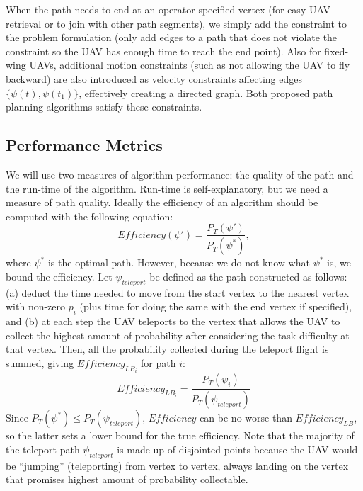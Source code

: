 When the path needs to end at an operator-specified vertex (for easy UAV retrieval or to join with other path segments), we simply add the constraint to the problem formulation (only add edges to a path that does not violate the constraint so the UAV has enough time to reach the end point). Also for fixed-wing UAVs, additional motion constraints (such as not allowing the UAV to fly backward) are also introduced as velocity constraints affecting edges $\{\psi(t), \psi(t_1)\}$, effectively creating a directed graph. Both proposed path planning algorithms satisfy these constraints.

\subsection{Performance Metrics}

We will use two measures of algorithm performance: the quality of the path and the run-time of the algorithm. Run-time is self-explanatory, but we need a measure of path quality. Ideally the efficiency of an algorithm should be computed with the following equation:
\begin{equation}
\mathit{Efficiency}(\psi') = \frac{P_T(\psi')}{P_T(\psi^*)},
\label{Efficiency}
\end{equation}
where $\psi^*$ is the optimal path. However, because we do not know what $\psi^*$ is, we bound the efficiency. Let $\psi_{teleport}$ be defined as the path constructed as follows: (a) deduct the time needed to move from the start vertex to the nearest vertex with non-zero $p_i$ (plus time for doing the same with the end vertex if specified), and (b) at each step the UAV teleports to the vertex that allows the UAV to collect the highest amount of probability after considering the task difficulty at that vertex. Then, all the probability collected during the teleport flight is summed, giving $\mathit{Efficiency_{LB_i}}$ for path $i$:
\begin{equation}
\mathit{Efficiency_{LB_i}} = \frac{P_T(\psi_i)}{P_T(\psi_{teleport})}
\label{EfficiencyLB}
\end{equation}
Since $P_T(\psi^*) \leq P_T(\psi_{teleport})$, $\mathit{Efficiency}$ can be no worse than $\mathit{Efficiency_{LB}}$, so the latter sets a lower bound for the true efficiency. Note that the majority of the teleport path $\psi_{teleport}$ is made up of disjointed points because the UAV would be ``jumping'' (teleporting) from vertex to vertex, always landing on the vertex that promises highest amount of probability collectable.

